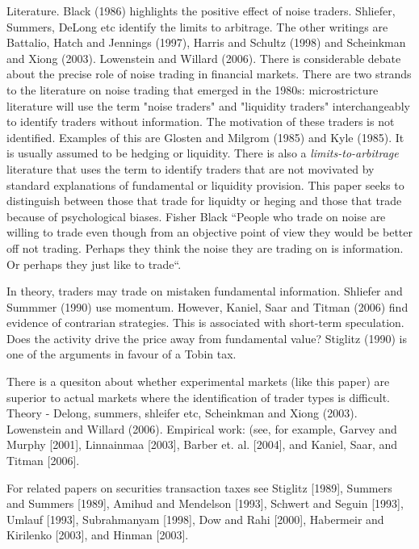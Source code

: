 \documentclass[12pt, a4paper, oneside]{article}\usepackage[]{graphicx}\usepackage[]{color}
\begin{document}
Literature.  Black (1986) highlights the positive effect of noise traders. Shliefer, Summers, DeLong etc identify the limits to arbitrage. The other writings are Battalio, Hatch and Jennings (1997), Harris and Schultz (1998) and Scheinkman and Xiong (2003).  Lowenstein and Willard (2006).  There is considerable debate about the precise role of noise trading in financial markets. There are two strands to the literature on noise trading that emerged in the 1980s:  microstricture literature will use the term "noise traders" and "liquidity traders" interchangeably to identify traders without information.  The motivation of these traders is not identified. Examples of this are Glosten and Milgrom (1985) and Kyle (1985). It is usually assumed to be hedging or liquidity. There is also a \emph{limits-to-arbitrage} literature that uses the term to identify traders that are not movivated by standard explanations of fundamental or liquidity provision. This paper seeks to distinguish between those that trade for liquidty or heging and those that trade because of psychological biases. Fisher Black ``People who trade on noise 
are willing to trade even though from an objective point of view they would be better off 
not trading. Perhaps they think the noise they are trading on is information. Or perhaps 
they just like to trade``.  

In theory, traders may trade on mistaken fundamental information.  Shliefer and Summmer (1990) use momentum.  However, Kaniel, Saar and Titman (2006) find evidence of contrarian strategies. This is associated with short-term speculation. Does the activity drive the price away from fundamental value? Stiglitz (1990) is one of the arguments in favour of a Tobin tax. 

There is a quesiton about whether experimental markets (like this paper) are superior to actual markets where the identification of trader types is difficult.  Theory - Delong, summers, shleifer etc,  Scheinkman and Xiong (2003).  Lowenstein and Willard (2006).  Empirical work:  (see, for example, Garvey and Murphy [2001], Linnainmaa [2003], Barber et. al. [2004], and Kaniel, Saar, and Titman [2006].  

For related papers on securities transaction taxes see Stiglitz [1989], Summers and Summers [1989], 
Amihud and Mendelson [1993], Schwert and Seguin [1993], Umlauf [1993], Subrahmanyam [1998], Dow 
and Rahi [2000], Habermeir and Kirilenko [2003], and Hinman [2003]. 
\end{document}
